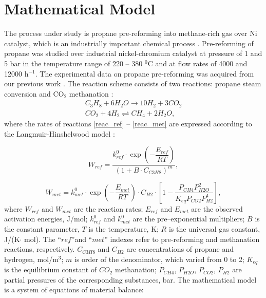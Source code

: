 \documentclass{svproc}
\begin{document}
\section{Mathematical Model}\label{Sec_math_mod}

The process under study is propane pre-reforming into methane-rich gas over Ni catalyst, which is an industrially important chemical process \cite{USKOV2019126741, Uskov_en}. Pre-reforming of propane was studied over industrial nickel-chromium catalyst at pressure of 1 and 5 bar in the temperature range of 220 -- 380 $^0$C and at flow rates of 4000 and 12000 h$^{-1}$. The experimental data on propane pre-reforming was acquired from our previous work \cite{Uskov_en}.  The reaction scheme consists of two reactions: propane steam conversion and CO$_2$ methanation \cite{Uskov_cat}:
\begin{gather}
C_3H_8 + 6H_2O \rightarrow 10H_2 + 3CO_2 \label{reac_ref}\\
CO_2 + 4H_2 \rightleftharpoons CH_4 + 2H_2O \label{reac_met},
\end{gather}
where the rates of reactions \eqref{reac_ref} -- \eqref{reac_met} are expressed according to the Langmuir-Hinshelwood model \cite{USKOV2019126741}:

\[
W_{ref} = \dfrac{k_{ref}^0 \cdot \exp \left(- \dfrac{E_{ref}}{RT} \right) }{\left(1 + B \cdot C_{C3H8}\right)^m},
\]

\[
W_{met} = k_{met}^0 \cdot \exp \left(- \dfrac{E_{met}}{RT} \right) \cdot C_{H2} \cdot \left[1 - \dfrac{P_{CH4} P_{H2O}^2}{K_{eq} P_{CO2} P_{H2}^4 }\right] ,
\]
where $W_{ref}$ and $W_{met}$ are the reaction rates; $E_{ref}$ and $E_{met}$ are the observed activation energies, J/mol; $k^0_{ref}$ and $k^0_{met}$ are the pre–exponential multipliers; $B$ is the constant parameter, $T$ is the temperature, K; $R$ is the universal gas constant, J/(K$\cdot$ mol). The ``$ref$''and ``$met$'' indexes refer to pre-reforming and methanation reactions, respectively. $C_{C3H8}$ and $C_{H2}$ are concentrations of propane and hydrogen, mol/m$^3$; $m$ is order of the denominator, which varied from 0 to 2; $K_{eq}$ is the equilibrium constant of $CO_2$ methanation; $P_{CH4}$, $P_{H2O}$, $P_{CO2}$, $P_{H2}$ are partial pressures of the corresponding substances, bar. The mathematical model is a system of equations of material balance:
\end{document}
